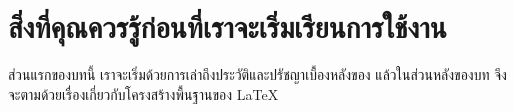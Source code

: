 \chapter[สิ่งที่คุณควรรู้\ldots]{สิ่งที่คุณควรรู้ก่อนที่เราจะเริ่มเรียนการใช้งาน \LaTeXe}
ส่วนแรกของบทนี้ เราจะเริ่มด้วยการเล่าถึงประวัติและปรัชญาเบื้องหลังของ \LaTeXe
แล้วในส่วนหลังของบท จึงจะตามด้วยเรื่องเกี่ยวกับโครงสร้างพื้นฐานของ \LaTeX
\shbtoaddmoretranslation
